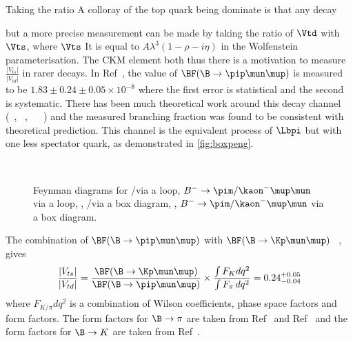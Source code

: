 Taking the ratio 
A colloray of the top quark being dominate is that any decay 



but a more precise measurement can be made by taking the ratio of $\Vtd$ with $\Vts$, where $\Vts$  It is equal to $A\lambda^{3}(1 - \rho - i \eta)$ in the Wolfenstein parameterisation. The CKM element both  thus there is a motivation to measure $\frac{|V_{ts}|}{|V_{td}|}$ in rarer decays.
In Ref~\cite{pimumunew}, the value of $\BF(\B\to\pip\mun\mup)$ is measured to be $1.83\pm0.24\pm0.05 \times 10^{-8}$ where the first error is statistical and the second is systematic. There has been much theoretical work around this decay channel (~\cite{bpipi_th_1}, ~\cite{bpipi_th_2}, ~\cite{bpipi_th_3} ~\cite{bpipi_th_4}) and the measured branching fraction was found to be consistent with theoretical prediction.  This channel is the equivalent process of $\Lbpi$ but with one less spectator quark, as demonstrated in \autoref{fig:boxpeng}.

\begin{figure}[!h]\def\nh{0.5\textwidth}
  \centering
  \hspace*{-1cm}
  \\
  \hspace*{-1cm}
  \caption{Feynman diagrams for \protect{} \Lb\to\proton\pim/\Km\mup\mun via a loop,  \protect{} $B^{-}\to\pim/\kaon^{-}\mup\mun$ via a loop,  \protect{}, \Lb\to\proton\pim/\Km\mup\mun via a box diagram,
   \protect{}, $B^{-}\to\pim/\kaon^{-}\mup\mun$ via a box diagram.
  }
  \label{fig:boxpeng}
\end{figure}
The combination of $\BF(\B\to\pip\mun\mup)$ with $\BF(\B\to\Kp\mun\mup)$ ~\cite{bKmumu},  gives
\begin{equation}
  \frac{|V_{ts}|}{|V_{td}|} = \frac{\BF(\B\to\Kp\mun\mup)}{\BF(\B\to\pip\mun\mup)} \times \frac{\int F_{K}d q^{2}}{\int F_{\pi}\,dq^{2}} = 0.24^{+0.05}_{-0.04}
  \end{equation}
where $F_{K/\pi}d q^{2}$ is a combination of Wilson coefficients, phase space factors and form factors. The form factors for $\B\to\pi$ are taken from Ref~\cite{bpimumuff1} and Ref~\cite{bpimumuff2} and the form factors for $\B\to K$ are taken from Ref~\cite{bKmumuff1}.


